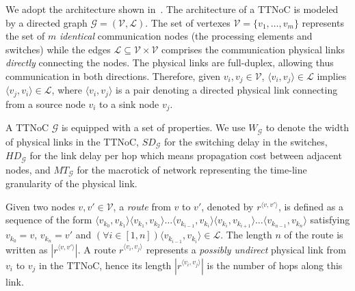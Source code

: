\documentclass[jornal]{IEEEtran}
\newcommand{\calG}{\mathcal{G}}
\newcommand{\calV}{\mathcal{V}}
\newcommand{\calL}{\mathcal{L}}
\newcommand{\width}{\mathit{W}_\calG}
\newcommand{\SD}{\mathit{SD}_\calG}
\newcommand{\HD}{\mathit{HD}_\calG}
\newcommand{\MT}{\mathit{MT}_\calG}
\newcommand{\route}[3]{#1^{\langle #2,#3\rangle}}
\begin{document}
We adopt the architecture shown
in~\cite{DBLP:conf/rtcsa/PaukovitsK08}. The architecture of a TTNoC is
modeled by a directed graph $\calG=(\calV,\calL)$. The set of vertexes
$\mathcal{V}=\{ v_{1},\dots,v_{m}\}$ represents the set of $m$
\emph{identical} communication nodes (the processing elements and
switches) while the edges $\mathcal{L}\subseteq \mathcal{V} \times
\mathcal{V}$ comprises the communication physical links
\emph{directly} connecting the nodes.  The physical links are
full-duplex, allowing thus communication in both
directions. Therefore, given $v_i,v_j\in\calV$, $\langle
v_i,v_j\rangle \in\calL$ implies $\langle v_j,v_i\rangle\in\calL$,
where $\langle v_i,v_j\rangle$ is a pair denoting a directed physical
link connecting from a source node $v_i$ to a sink node $v_j$.

A TTNoC $\calG$ is equipped with a set of properties. We use $\width$
to denote the width of physical links in the TTNoC, $\SD$ for the
switching delay in the switches, $\HD$ for the link delay per hop
which means propagation cost between adjacent nodes, and $\MT$ for the
macrotick of network representing the time-line granularity of the
physical link.


Given two nodes $v,v'\in\calV$, a \emph{route} from $v$ to $v'$,
denoted by $\route{r}{v}{v'}$, is defined as a sequence of the form
$\langle v_{k_0},v_{k_1}\rangle\langle
v_{k_1},v_{k_2}\rangle\ldots\langle v_{k_{i-1}},v_{k_i}\rangle\langle
v_{k_i},v_{k_{i+1}}\rangle\ldots \langle v_{k_{n-1}},v_{k_n}\rangle$
satisfying $v_{k_0}=v$, $v_{k_n}=v'$ and $(\forall i\in [1,n])\langle
v_{k_{i-1}},v_{k_i}\rangle \in\calL$. The length $n$ of the route is
written as $|\route{r}{v}{v'}|$. A route $\route{r}{v_i}{v_j}$
represents a \emph{possibly undirect} physical link from $v_i$ to
$v_j$ in the TTNoC, hence its length $|\route{r}{v_i}{v_j}|$ is the
number of hops along this link.
\end{document}
